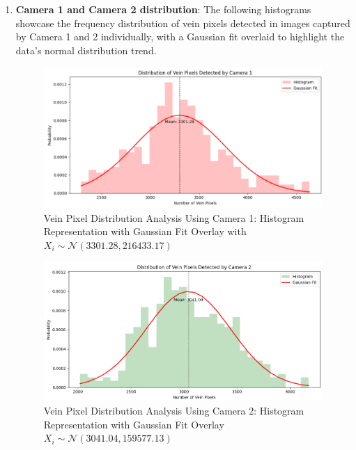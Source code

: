 \begin{enumerate}
    \item \textbf{Camera 1 and Camera 2 distribution}: The following histograms showcase the frequency distribution of vein pixels detected in images captured by Camera 1 and 2 individually, with a Gaussian fit overlaid to highlight the data's normal distribution trend.

    \begin{figure}[H]
        \centering
        \includegraphics[width=1\linewidth]{latex-img/distribution_veins_cam1.png}
        \caption{Vein Pixel Distribution Analysis Using Camera 1: Histogram Representation with Gaussian Fit Overlay with \(X_i \sim \mathcal{N}(3301.28, 216433.17)\)}
        \label{distribution_veins_cam1}
    \end{figure}

    \begin{figure}[H]
        \centering
        \includegraphics[width=1\linewidth]{latex-img/distribution_veins_cam2.png}
        \caption{Vein Pixel Distribution Analysis Using Camera 2: Histogram Representation with Gaussian Fit Overlay \(X_i \sim \mathcal{N}(3041.04, 159577.13)\)}
        \label{distribution_veins_cam2}
    \end{figure}
 

\end{enumerate}
